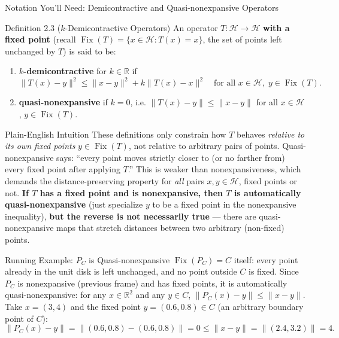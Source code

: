 \documentclass[aspectratio=169,10pt]{beamer}
\DeclareMathOperator{\Fix}{Fix}
\newcommand{\R}{\mathbb{R}}
\begin{document}
\begin{frame}[allowframebreaks]{Notation You'll Need: Demicontractive and Quasi-nonexpansive Operators}

  \begin{block}{Definition 2.3 ($k$-Demicontractive Operators)}
    An operator $T : \mathcal{H} \to \mathcal{H}$ \textbf{with a fixed point}
    (recall $\Fix(T) = \{x \in \mathcal{H} : T(x) = x\}$, the set of points
    left unchanged by $T$) is said to be:
    \begin{enumerate}
      \item[(1)] \textbf{$k$-demicontractive} for $k \in \R$ if
        \[
          \|T(x) - y\|^2 \le \|x-y\|^2 + k\|T(x) - x\|^2
          \quad \text{for all } x \in \mathcal{H}, \; y \in \Fix(T).
        \]
      \item[(2)] \textbf{quasi-nonexpansive} if $k = 0$, i.e.
        $\|T(x) - y\| \le \|x - y\|$ for all $x \in \mathcal{H}$,
        $y \in \Fix(T)$.
    \end{enumerate}
  \end{block}

  \begin{block}{Plain-English Intuition}
    These definitions only constrain how $T$ behaves \emph{relative to its
    own fixed points} $y \in \Fix(T)$, not relative to arbitrary pairs of
    points. Quasi-nonexpansive says: ``every point moves strictly closer to
    (or no farther from) every fixed point after applying $T$.'' This is
    weaker than nonexpansiveness, which demands the distance-preserving
    property for \emph{all} pairs $x,y \in \mathcal{H}$, fixed points or not.
    \textbf{If $T$ has a fixed point and is nonexpansive, then $T$ is
    automatically quasi-nonexpansive} (just specialize $y$ to be a fixed
    point in the nonexpansive inequality), \textbf{but the reverse is not
    necessarily true} --- there are quasi-nonexpansive maps that stretch
    distances between two arbitrary (non-fixed) points.
  \end{block}

  \framebreak

  \begin{exampleblock}{Running Example: $P_C$ is Quasi-nonexpansive}
    $\Fix(P_C) = C$ itself: every point already in the unit disk is left
    unchanged, and no point outside $C$ is fixed. Since $P_C$ is nonexpansive
    (previous frame) and has fixed points, it is automatically
    quasi-nonexpansive: for any $x \in \R^2$ and any $y \in C$,
    $\|P_C(x) - y\| \le \|x - y\|$. Take $x = (3,4)$ and the fixed point
    $y = (0.6, 0.8) \in C$ (an arbitrary boundary point of $C$):
    \[
      \|P_C(x) - y\| = \|(0.6,0.8)-(0.6,0.8)\| = 0 \le \|x - y\| = \|(2.4, 3.2)\| = 4.
    \]
  \end{exampleblock}

\end{frame}
\end{document}
